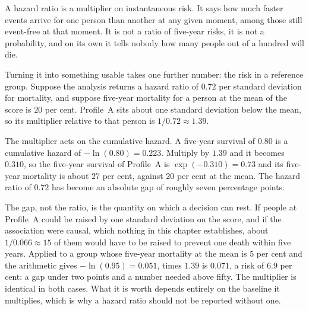 \begin{reading}
A hazard ratio is a multiplier on instantaneous risk. It says how much faster events arrive for one person than another at any given moment, among those still event-free at that moment. It is not a ratio of five-year risks, it is not a probability, and on its own it tells nobody how many people out of a hundred will die.

Turning it into something usable takes one further number: the risk in a reference group. Suppose the analysis returns a hazard ratio of $0.72$ per standard deviation for mortality, and suppose five-year mortality for a person at the mean of the score is $20$ per cent. Profile~A sits about one standard deviation below the mean, so its multiplier relative to that person is $1/0.72\approx1.39$.

The multiplier acts on the cumulative hazard. A five-year survival of $0.80$ is a cumulative hazard of $-\ln(0.80)=0.223$. Multiply by $1.39$ and it becomes $0.310$, so the five-year survival of Profile~A is $\exp(-0.310)=0.73$ and its five-year mortality is about $27$ per cent, against $20$ per cent at the mean. The hazard ratio of $0.72$ has become an absolute gap of roughly seven percentage points.

The gap, not the ratio, is the quantity on which a decision can rest. If people at Profile~A could be raised by one standard deviation on the score, and if the association were causal, which nothing in this chapter establishes, about $1/0.066\approx15$ of them would have to be raised to prevent one death within five years. Applied to a group whose five-year mortality at the mean is $5$ per cent and the arithmetic gives $-\ln(0.95)=0.051$, times $1.39$ is $0.071$, a risk of $6.9$ per cent: a gap under two points and a number needed above fifty. The multiplier is identical in both cases. What it is worth depends entirely on the baseline it multiplies, which is why a hazard ratio should not be reported without one.
\end{reading}

